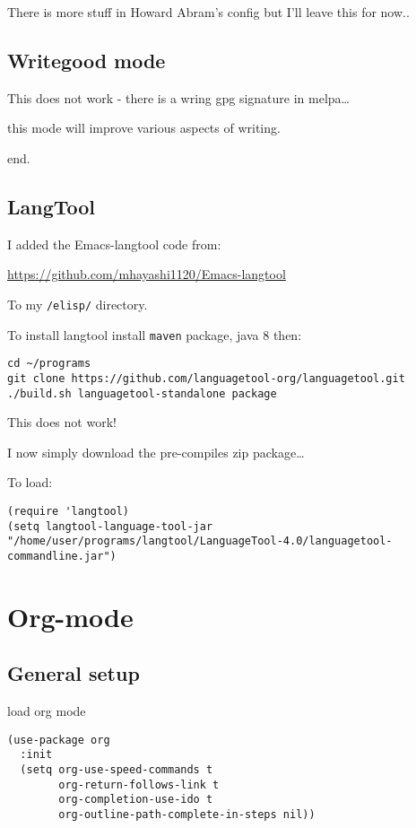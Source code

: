 \documentclass[12pt]{article}
\begin{document}
There is more stuff in Howard Abram's config but I'll leave this for now..



\subsection{Writegood mode}
\label{sec:org8aff807}
This does not work - there is a wring gpg signature in melpa\ldots{} 

this mode will improve various aspects of writing. 

end.


\subsection{LangTool}
\label{sec:org21f5027}

I added the Emacs-langtool code from:

\url{https://github.com/mhayashi1120/Emacs-langtool}

To my \texttt{/elisp/} directory. 

To install langtool install \texttt{maven} package, java 8 then:

\begin{verbatim}
cd ~/programs
git clone https://github.com/languagetool-org/languagetool.git
./build.sh languagetool-standalone package

\end{verbatim}
This does not work! 

I now simply download the pre-compiles zip package\ldots{} 

To load: 
\begin{verbatim}
(require 'langtool)
(setq langtool-language-tool-jar "/home/user/programs/langtool/LanguageTool-4.0/languagetool-commandline.jar")
\end{verbatim}

\section{Org-mode}
\label{sec:org779785a}
\subsection{General setup}
\label{sec:org3404712}

load org mode

\begin{verbatim}
(use-package org
  :init
  (setq org-use-speed-commands t
        org-return-follows-link t
        org-completion-use-ido t
        org-outline-path-complete-in-steps nil))
\end{verbatim}
\end{document}
